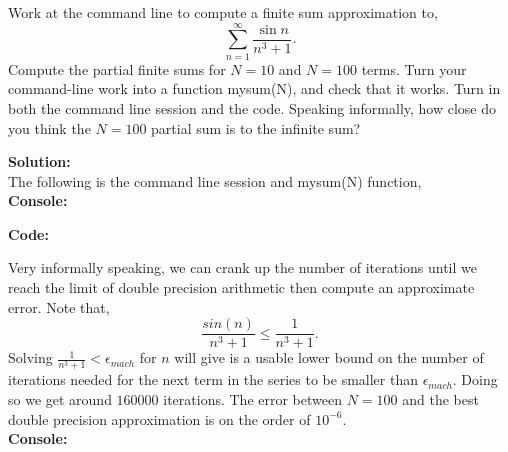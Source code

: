 \documentclass[12pt]{article}
\makeatletter
\theoremstyle{homework}
\newenvironment{exercise}[1]
{\def\@currentlabel{#1}\exercisecore}
{\endexercisecore}
\newcommand{\localhead}[1]{\par\smallskip\noindent\textbf{#1}\nobreak\\}%
\newcommand\solution{\localhead{Solution:}}
\makeatother
\begin{document}
\begin{exercise}{Problem P3} Work at the command line to compute a finite sum approximation to, 
  \begin{equation*}
    \sum_{n = 1}^{\infty} \frac{\sin n}{n^3 + 1}.
  \end{equation*}
  Compute the partial finite sums for $N = 10$ and $N = 100$ terms. Turn your command-line work 
  into a function mysum(N), and check that it works. Turn in both the command line session and the code. Speaking informally, how close do you think the $N = 100$ partial sum is to the infinite sum?
  \solution The following is the command line session and mysum(N) function,\\
    \textbf{Console:}
    \begin{center}
      
    \end{center}

    \textbf{Code:}
    \begin{center}
      
    \end{center}

  Very informally speaking, we can crank up the number of iterations until we reach the limit of double precision arithmetic then compute an approximate error. Note that,
  \begin{equation*}
    \frac{sin(n)}{n^3 + 1} \leq \frac{1}{n^3 + 1}.
  \end{equation*}
  Solving $\frac{1}{n^3 + 1} < \epsilon_{mach}$ for $n$ will give is a usable lower bound on the number of iterations needed for the next term in the series to be smaller than $\epsilon_{mach}$.
  Doing so we get around $160000$ iterations. The error between $N = 100$ and the best double precision approximation is on the order of $10^{-6}$.\\    
  \textbf{Console:}
  \begin{center}
    
  \end{center}
\end{exercise}
\vspace{1in}
\end{document}
